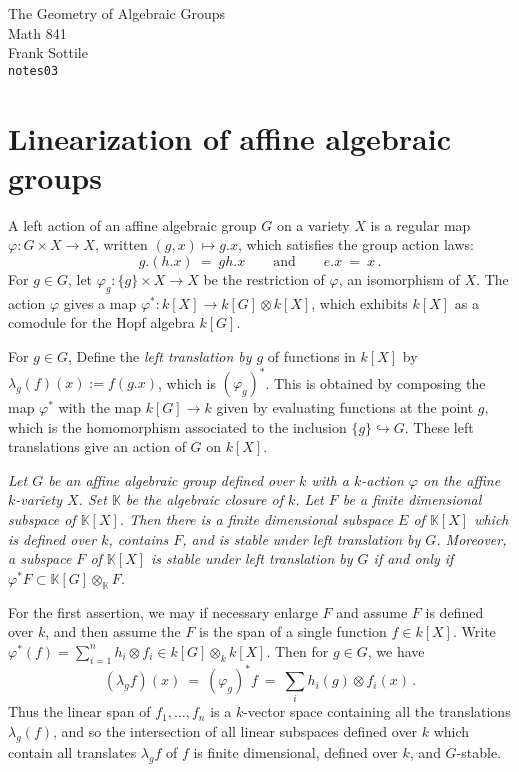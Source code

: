 \documentclass[12pt]{amsart}
\def\silentfootnote#1{{\let\thefootnote\relax\footnotetext{#1}}}
\begin{document}
\begin{center}
\Large
The Geometry of Algebraic Groups\\
\large
Math 841\\
Frank Sottile\\
{\tt notes03}
\end{center}\bigskip

\silentfootnote{\sl Version of 8 February 2000.} 

\section{Linearization of affine algebraic groups}


A left action of an affine algebraic group $G$ on a variety $X$
is a regular map $\varphi\colon G\times X\to X$, written $(g,x)\mapsto g.x$,
which satisfies the group action laws:
$$
  g.(h.x)\ =\ gh.x\qquad\mbox{and}\qquad e.x\ =\ x\,.
$$
For $g\in G$, let $\varphi_g\colon \{g\}\times X\to X$ be the restriction of
$\varphi$, an isomorphism of $X$.
The action $\varphi$ gives a map $\varphi^*\colon k[X]\to k[G]\otimes k[X]$,
which exhibits 
$k[X]$ as a comodule for the Hopf algebra $k[G]$.

For $g\in G$, 
Define the {\it left translation by $g$} of functions in $k[X]$ by 
$\lambda_g(f)(x):=f(g.x)$, which is $(\varphi_g)^*$. 
This is obtained by composing the map $\varphi^*$ with the map 
$k[G]\to k$ given by evaluating functions at the point $g$,
which is the homomorphism associated to the inclusion 
$\{g\}\hookrightarrow G$.
These left translations give an action of $G$ on $k[X]$.
\medskip

{\it 
Let $G$ be an affine algebraic group defined over $k$ with a $k$-action
$\varphi$ on the affine $k$-variety $X$.
Set ${\mathbb K}$ be the algebraic closure of $k$.
Let $F$ be a finite dimensional subspace of ${\mathbb K}[X]$.
Then there is a finite dimensional subspace $E$ of
${\mathbb K}[X]$ which is defined over $k$, contains $F$, and is stable
under left translation by $G$. 
Moreover, a subspace  $F$ of ${\mathbb K}[X]$ is stable under left
translation by $G$ if and only if  
$\varphi^*F\subset {\mathbb K}[G]\otimes_{\mathbb K} F$.
}\medskip

For the first assertion, we may if necessary enlarge $F$ and assume $F$ is
defined over $k$, and then assume the $F$ is the span of a single
function $f\in k[X]$.
Write $\varphi^*(f)=\sum_{i=1}^n h_i\otimes f_i\in k[G]\otimes_k k[X]$.
Then for $g\in G$, we have 
$$
 (\lambda_gf)(x)\ =\ (\varphi_g)^*f\ =\ 
  \sum_ih_i(g)\otimes f_i(x)\,.
$$
Thus the linear span of $f_1,\ldots,f_n$ is a $k$-vector space containing
all the translations $\lambda_g(f)$, and so the intersection of all 
linear subspaces defined over $k$ which contain all translates $\lambda_gf$ of
$f$ is finite dimensional, defined over $k$, and $G$-stable. 
\end{document}
